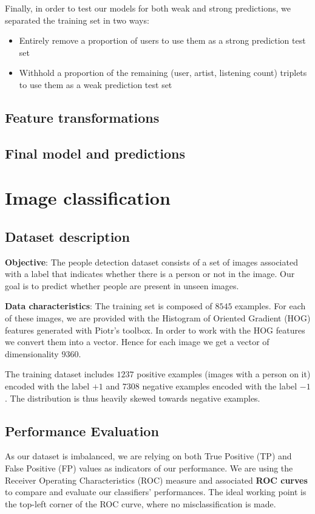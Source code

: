 \documentclass{article}
\begin{document}
  Finally, in order to test our models for both weak and strong predictions, we separated the training set in two ways:
  \begin{itemize}
    \item Entirely remove a proportion of users to use them as a strong prediction test set
    \item Withhold a proportion of the remaining (user, artist, listening count) triplets to use them as a weak prediction test set
  \end{itemize}

  \subsection{Feature transformations}

  \subsection{Final model and predictions}



\section{Image classification}

  \subsection{Dataset description}
  \textbf{Objective}: The people detection dataset consists of a set of images associated with a label that indicates whether there is a person or not in the image. Our goal is to predict whether people are present in unseen images.

  \textbf{Data characteristics}: The training set is composed of $8545$ examples. For each of these images, we are provided with the Histogram of Oriented Gradient (HOG) features generated with Piotr's toolbox. In order to work with the HOG features we convert them into a vector. Hence for each image we get a vector of dimensionality $9360$.

  The training dataset includes $1237$ positive examples (images with a person on it) encoded with the label $+1$ and $7308$ negative examples encoded with the label $-1$. The distribution is thus heavily skewed towards negative examples.

  \subsection{Performance Evaluation}
  As our dataset is imbalanced, we are relying on both True Positive (TP) and False Positive (FP) values as indicators of our performance. We are using the Receiver Operating Characteristics (ROC) measure and associated \textbf{ROC curves} to compare and evaluate our classifiers' performances. The ideal working point is the top-left corner of the ROC curve, where no misclassification is made.
\end{document}
